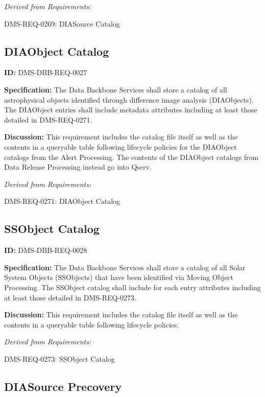 \documentclass[SE,toc]{lsstdoc}
\begin{document}
\emph{Derived from Requirements:}

DMS-REQ-0269:
DIASource Catalog \newline

\subsection{DIAObject Catalog}

\label{DMS-DBB-REQ-0027}
\textbf{ID:} DMS-DBB-REQ-0027

\textbf{Specification:}
The Data Backbone Services shall store a catalog of all astrophysical objects identified through difference image analysis (DIAObjects). The DIAObject entries shall include metadata attributes including at least those detailed in DMS-REQ-0271.

\textbf{Discussion:}
This requirement includes the catalog file itself as well as the contents in a queryable table following lifecycle policies for the DIAObject catalogs from the Alert Processing.  The contents of the DIAObject catalogs from Data Release Processing instead go into Qserv.

\emph{Derived from Requirements:}

DMS-REQ-0271:
DIAObject Catalog \newline

\subsection{SSObject Catalog}

\label{DMS-DBB-REQ-0028}
\textbf{ID:} DMS-DBB-REQ-0028

\textbf{Specification:}
The Data Backbone Services shall store a catalog of all Solar System Objects (SSObjects) that have been identified via Moving Object Processing. The SSObject catalog shall include for each entry attributes including at least those detailed in DMS-REQ-0273.

\textbf{Discussion:}
This requirement includes the catalog file itself as well as the contents in a queryable table following lifecycle policies.

\emph{Derived from Requirements:}

DMS-REQ-0273:
SSObject Catalog \newline

\subsection{DIASource Precovery}
\end{document}
